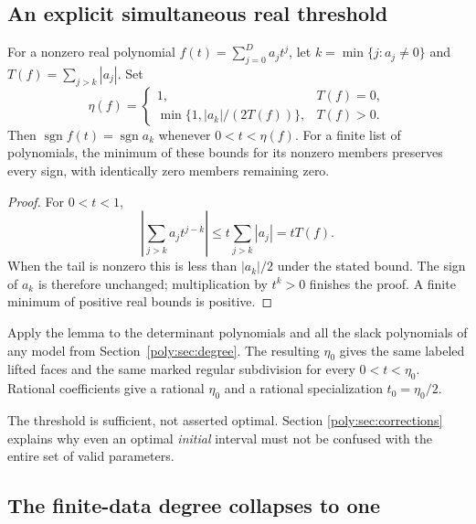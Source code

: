 \documentclass[11pt,a4paper]{article}
\numberwithin{equation}{section}
\theoremstyle{plain}
\newcommand{\sgn}{\operatorname{sgn}}
\begin{document}
\subsection{An explicit simultaneous real threshold}

\begin{lemma}\label{poly:lem:eta}
For a nonzero real polynomial $f(t)=\sum_{j=0}^D a_jt^j$, let
$k=\min\{j:a_j\ne0\}$ and $T(f)=\sum_{j>k}|a_j|$. Set
\[
 \eta(f)=
 \begin{cases}
  1,&T(f)=0,\\
  \min\{1,|a_k|/(2T(f))\},&T(f)>0.
 \end{cases}
\]
Then $\sgn f(t)=\sgn a_k$ whenever $0<t<\eta(f)$. For a finite list
of polynomials, the minimum of these bounds for its nonzero members
preserves every sign, with identically zero members remaining zero.
\end{lemma}
\begin{proof}
For $0<t<1$,
\[
 \left|\sum_{j>k}a_jt^{j-k}\right|
 \le t\sum_{j>k}|a_j|=tT(f).
\]
When the tail is nonzero this is less than $|a_k|/2$ under the stated bound.
The sign of $a_k$ is therefore unchanged; multiplication by $t^k>0$
finishes the proof. A finite minimum of positive real bounds is positive.
\end{proof}

Apply the lemma to the determinant polynomials and all the slack
polynomials of any model from Section~\ref{poly:sec:degree}. The resulting
$\eta_0$ gives the same labeled lifted faces and the same marked regular
subdivision for every $0<t<\eta_0$. Rational coefficients give a rational
$\eta_0$ and a rational specialization $t_0=\eta_0/2$.

The threshold is sufficient, not asserted optimal. Section
\ref{poly:sec:corrections} explains why even an optimal \emph{initial} interval
must not be confused with the entire set of valid parameters.

\subsection{The finite-data degree collapses to one}
\end{document}
